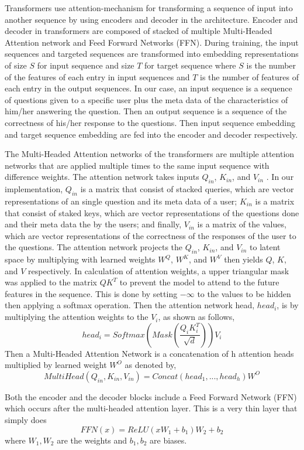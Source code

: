 \documentclass{article}
\begin{document}
Transformers use attention-mechanism for transforming a sequence of input into another sequence by using encoders and decoder in the architecture. Encoder and decoder in transformers are composed of stacked of multiple Multi-Headed Attention network and Feed Forward Networks (FFN). During training, the input sequences and targeted sequences are transformed into embedding representations of size $S$ for input sequence and size $T$ for target sequence where $S$ is the number of the features of each entry in input sequences and $T$ is the number of features of each entry in the output sequences. In our case, an input sequence is a sequence of questions given to a specific user plus the meta data of the characteristics of him/her answering the question. Then an output sequence is a sequence of the correctness of his/her response to the questions. Then input sequence embedding and target sequence embedding are fed into the encoder and decoder respectively. 

The Multi-Headed Attention networks of the transformers are multiple attention networks that are applied multiple times to the same input sequence with difference weights. The attention network takes inputs $Q_{in}$, $K_{in}$, and $V_{in}$ \cite{Choi2020}. In our implementation, $Q_{in}$ is a matrix that consist of stacked queries, which are vector representations of an single question and its meta data of a user; $K_{in}$ is a matrix that consist of staked keys, which are vector representations of the questions done and their meta data the by the users; and finally, $V_{in}$ is a matrix of the values, which are vector representations of the correctness of the responses of the user to the questions. The attention network projects the $Q_{in}$, $K_{in}$, and $V_{in}$ to latent space by multiplying with learned weights $W^Q$, $W^K$, and $W^V$ then yields $Q$, $K$, and $V$ respectively. In calculation of attention weights, a upper triangular mask was applied to the matrix $QK^T$ to prevent the model to attend to the future features in the sequence. This is done by setting $-\infty$ to the values to be hidden then applying a softmax operation. Then the attention network head, $head_i$, is by multiplying the attention weights to the $V_i$, as shown as follows, $$head_i = Softmax(Mask(\frac{Q_iK_i^T}{\sqrt{d}}))V_i$$
Then a Multi-Headed Attention Network is a concatenation of h attention heads multiplied by learned weight $W^O$ as denoted by, $$MultiHead(Q_{in}, K_{in}, V_{in})=Concat(head_1,...,head_h)W^O$$

Both the encoder and the decoder blocks include a Feed Forward Network (FFN) which occurs after the multi-headed attention layer. This is a very thin layer that simply does $$FFN(x) = ReLU(xW_1 + b_1)W_2 + b_2$$ where $W_1, W_2$ are the weights and $b_1, b_2$ are biases. \cite{Choi2020}
\end{document}
